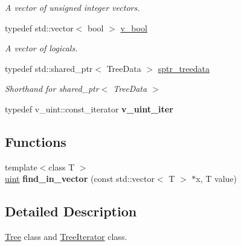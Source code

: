 \begin{DoxyCompactItemize}
\begin{DoxyCompactList}\small\item\em A vector of unsigned integer vectors. \end{DoxyCompactList}\item 
typedef std\+::vector$<$ bool $>$ \hyperlink{namespacepruner_a7f5576bfe937fd464f6f67ed49997da3}{v\+\_\+bool}\hypertarget{namespacepruner_a7f5576bfe937fd464f6f67ed49997da3}{}\label{namespacepruner_a7f5576bfe937fd464f6f67ed49997da3}

\begin{DoxyCompactList}\small\item\em A vector of logicals. \end{DoxyCompactList}\item 
typedef std\+::shared\+\_\+ptr$<$ Tree\+Data $>$ \hyperlink{namespacepruner_a533476fef17527e75c4fba71d8c4ce50}{sptr\+\_\+treedata}\hypertarget{namespacepruner_a533476fef17527e75c4fba71d8c4ce50}{}\label{namespacepruner_a533476fef17527e75c4fba71d8c4ce50}

\begin{DoxyCompactList}\small\item\em Shorthand for shared\+\_\+ptr$<$ Tree\+Data $>$ \end{DoxyCompactList}\item 
typedef v\+\_\+uint\+::const\+\_\+iterator {\bfseries v\+\_\+uint\+\_\+iter}\hypertarget{namespacepruner_adb695993f778a41bcfc1eed151f9c0bd}{}\label{namespacepruner_adb695993f778a41bcfc1eed151f9c0bd}

\end{DoxyCompactItemize}
\subsection*{Functions}
\begin{DoxyCompactItemize}
\item 
{\footnotesize template$<$class T $>$ }\\\hyperlink{namespacepruner_a659e6e64a9e2b8e981c3d34262a2f67e}{uint} {\bfseries find\+\_\+in\+\_\+vector} (const std\+::vector$<$ T $>$ $\ast$x, T value)\hypertarget{namespacepruner_a351966f6c1802af422254d6ee004eea6}{}\label{namespacepruner_a351966f6c1802af422254d6ee004eea6}

\end{DoxyCompactItemize}


\subsection{Detailed Description}
\hyperlink{classpruner_1_1Tree}{Tree} class and \hyperlink{classpruner_1_1TreeIterator}{Tree\+Iterator} class. 